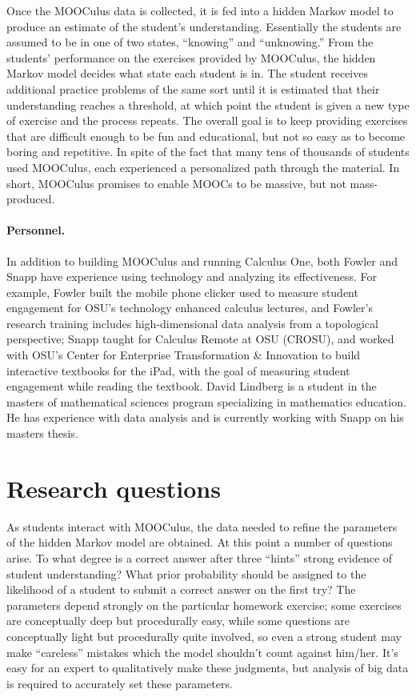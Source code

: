 \documentclass[12pt]{article}
\begin{document}
Once the MOOCulus data is collected, it is fed into a hidden Markov
model to produce an estimate of the student's
understanding. Essentially the students are assumed to be in one of
two states, ``knowing'' and ``unknowing.''  From the students'
performance on the exercises provided by MOOCulus, the hidden Markov
model decides what state each student is in. The student receives
additional practice problems of the same sort until it is estimated
that their understanding reaches a threshold, at which point the
student is given a new type of exercise and the process repeats.  The
overall goal is to keep providing exercises that are difficult enough
to be fun and educational, but not so easy as to become boring and
repetitive.  In spite of the fact that many tens of thousands of
students used MOOCulus, each experienced a personalized path through
the material.  In short, MOOCulus promises to enable MOOCs to be
massive, but not mass-produced.


\paragraph{Personnel.} 
In addition to building MOOCulus and running Calculus One, both Fowler
and Snapp have experience using technology and analyzing its
effectiveness.  For example, Fowler built the mobile phone clicker
used to measure student engagement for OSU's technology enhanced
calculus lectures, and Fowler's research training includes
high-dimensional data analysis from a topological perspective; Snapp
taught for Calculus Remote at OSU (CROSU), and worked with OSU's
Center for Enterprise Transformation \& Innovation to build
interactive textbooks for the iPad, with the goal of measuring student
engagement while reading the textbook. David Lindberg is a student in
the masters of mathematical sciences program specializing in
mathematics education. He has experience with data analysis and is
currently working with Snapp on his masters thesis.

\section{Research questions}

As students interact with MOOCulus, the data needed to refine the
parameters of the hidden Markov model are obtained.  At this point a
number of questions arise. To what degree is a correct answer after
three ``hints'' strong evidence of student understanding?  What prior
probability should be assigned to the likelihood of a student to
submit a correct answer on the first try?  The parameters depend
strongly on the particular homework exercise; some exercises are
conceptually deep but procedurally easy, while some questions are
conceptually light but procedurally quite involved, so even a strong
student may make ``careless'' mistakes which the model shouldn't count
against him/her.  It's easy for an expert to qualitatively make these
judgments, but analysis of big data is required to accurately set
these parameters.
\end{document}
